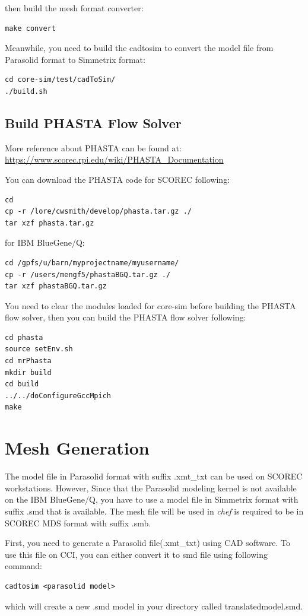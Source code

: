 \documentclass{article}
\begin{document}
then build the mesh format converter:
\begin{lstlisting}
make convert 
\end{lstlisting}

Meanwhile, you need to build the cadtosim to convert the model file from Parasolid format to Simmetrix format:
\begin{lstlisting}
cd core-sim/test/cadToSim/ 
./build.sh 
\end{lstlisting}

\subsection{Build PHASTA Flow Solver}

More reference about PHASTA can be found at:\\
\url{https://www.scorec.rpi.edu/wiki/PHASTA_Documentation} 

You can download the PHASTA code for SCOREC following:
\begin{lstlisting}
cd 
cp -r /lore/cwsmith/develop/phasta.tar.gz ./
tar xzf phasta.tar.gz
\end{lstlisting}
for IBM BlueGene/Q:
\begin{lstlisting}
cd /gpfs/u/barn/myprojectname/myusername/
cp -r /users/mengf5/phastaBGQ.tar.gz ./
tar xzf phastaBGQ.tar.gz
\end{lstlisting}
You need to clear the modules loaded for core-sim before building the PHASTA flow solver, then you can build the PHASTA flow solver following:
\begin{lstlisting}
cd phasta
source setEnv.sh
cd mrPhasta
mkdir build
cd build
../../doConfigureGccMpich
make
\end{lstlisting}


\section{Mesh Generation}
\label{ch:3}
The model file in Parasolid format with suffix .xmt\_txt can be used on SCOREC workstations. However, Since that the Parasolid modeling kernel is not available on the IBM BlueGene/Q, you have to use a model file in Simmetrix format with suffix .smd that is available. The mesh file will be used in \textit{chef} is required to be in SCOREC MDS format with suffix .smb.

First, you need to generate a Parasolid file(.xmt\_txt) using CAD software. To use this file on CCI, you can either convert it to smd file using following command:
\begin{lstlisting}
cadtosim <parasolid model> 
\end{lstlisting}
which will create a new .smd model in your directory called translatedmodel.smd.
\end{document}
